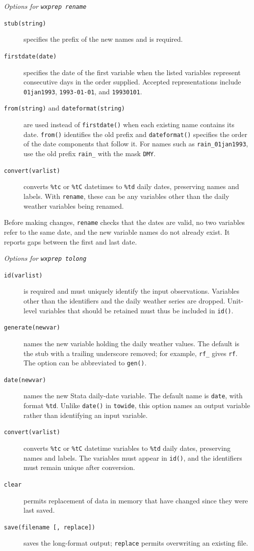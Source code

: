 \noindent\textit{Options for \texttt{wxprep rename}}

\begin{description}
	\item[\texttt{stub(string)}] specifies the prefix of the new names and is required.
	\item[\texttt{firstdate(date)}] specifies the date of the first variable when the listed variables represent consecutive days in the order supplied. Accepted representations include \texttt{01jan1993}, \texttt{1993-01-01}, and \texttt{19930101}.
	\item[\texttt{from(string)} and \texttt{dateformat(string)}] are used instead of \texttt{firstdate()} when each existing name contains its date. \texttt{from()} identifies the old prefix and \texttt{dateformat()} specifies the order of the date components that follow it. For names such as \texttt{rain\_01jan1993}, use the old prefix \texttt{rain\_} with the mask \texttt{DMY}.
	\item[\texttt{convert(varlist)}] converts \texttt{\%tc} or \texttt{\%tC} datetimes to \texttt{\%td} daily dates, preserving names and labels. With \texttt{rename}, these can be any variables other than the daily weather variables being renamed.
\end{description}

\noindent Before making changes, \texttt{rename} checks that the dates are valid, no two variables refer to the same date, and the new variable names do not already exist. It reports gaps between the first and last date.

\noindent\textit{Options for \texttt{wxprep tolong}}

\begin{description}
	\item[\texttt{id(varlist)}] is required and must uniquely identify the input observations. Variables other than the identifiers and the daily weather series are dropped. Unit-level variables that should be retained must thus be included in \texttt{id()}.
	\item[\texttt{generate(newvar)}] names the new variable holding the daily weather values. The default is the stub with a trailing underscore removed; for example, \texttt{rf\_} gives \texttt{rf}. The option can be abbreviated to \texttt{gen()}.
	\item[\texttt{date(newvar)}] names the new Stata daily-date variable. The default name is \texttt{date}, with format \texttt{\%td}. Unlike \texttt{date()} in \texttt{towide}, this option names an output variable rather than identifying an input variable.
	\item[\texttt{convert(varlist)}] converts \texttt{\%tc} or \texttt{\%tC} datetime variables to \texttt{\%td} daily dates, preserving names and labels. The variables must appear in \texttt{id()}, and the identifiers must remain unique after conversion.
	\item[\texttt{clear}] permits replacement of data in memory that have changed since they were last saved.
	\item[\texttt{save(filename [, replace])}] saves the long-format output; \texttt{replace} permits overwriting an existing file.
\end{description}


